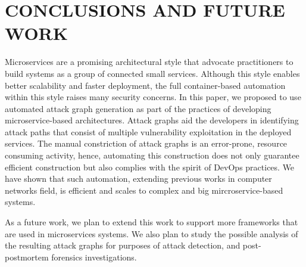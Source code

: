 \section{CONCLUSIONS AND FUTURE WORK}
\label{chap:conclusion}

Microservices are a promising architectural style that advocate practitioners to build systems as a group of connected small services. Although this style enables better scalability and faster deployment, the full container-based automation within this style raises many security concerns. In this paper, we proposed to use automated attack graph generation as part of the practices of developing microservice-based architectures. Attack graphs aid the developers in identifying attack paths that consist of multiple vulnerability exploitation in the deployed services. The manual constriction of attack graphs is an error-prone, resource consuming activity, hence, automating this construction does not only guarantee efficient construction but also complies with the spirit of DevOps practices. We have shown that such automation, extending previous works in computer networks field, is efficient and scales to complex and big mircroservice-based systems. 

As a future work, we plan to extend this work to support more frameworks that are used in microservices systems. We also plan to study the possible analysis of the resulting attack graphs for purposes of attack detection, and post-postmortem forensics investigations. 